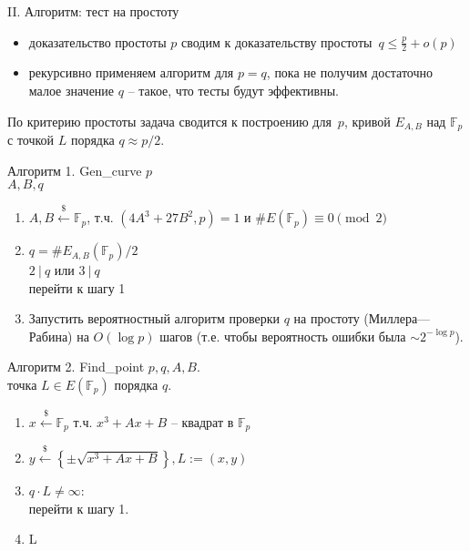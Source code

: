 \documentclass{beamer}
\begin{document}
\begin{frame}{II. Алгоритм: тест на простоту}
    \begin{itemize}
    	\item доказательство простоты $p$ сводим к доказательству простоты~$q \leq \frac{p}{2} + o(p)$
    	\item рекурсивно применяем алгоритм для $p = q$, пока не получим достаточно малое значение $q$ -- такое, что  тесты будут эффективны.
    \end{itemize}
    
    \vspace{0.5em}
    
    По критерию простоты задача сводится к построению для~$p$, кривой $E_{A,B}$ над $\mathbb{F}_p$ с точкой $L$ порядка $q \approx p/2$.
\end{frame}

\begin{frame}{Алгоритм 1. Gen\_curve}
     $p$\\
     $A,B,q$
    \begin{enumerate}
        \item $A, B \xleftarrow{\$} \mathbb{F}_p$, т.ч. $(4A^3 + 27B^2, p) = 1$ и $\#E(\mathbb{F}_p) \equiv 0 \pmod{2}$
        \item $q = \#E_{A,B}(\mathbb{F}_p) / 2$\\
         {$2\ |\ q$ или $3\ |\ q$}\\
        \quad перейти к шагу 1  
        \item Запустить вероятностный алгоритм проверки $q$ на простоту (Миллера—Рабина) на $O(\log p)$ шагов (т.е. чтобы вероятность ошибки была $\sim 2^{-\log p}$).
    \end{enumerate}
\end{frame}

\begin{frame}{Алгоритм 2. Find\_point}
     $p, q, A, B$.\\
     точка $L \in E(\mathbb{F}_p)$ порядка $q$.
    \begin{enumerate}
        \item $x \xleftarrow{\$} \mathbb{F}_p$ т.ч. $x^3+Ax+B$ -- квадрат в $\mathbb{F}_p$
        \item $y \xleftarrow{\$} \left\{ \pm \sqrt{x^3 + Ax+B} \right\}, L:=(x,y)$
        \item {} {$q \cdot L \neq \infty$}:\\
        \quad перейти к шагу 1.
        \item {} L
    \end{enumerate}
\end{frame}
\end{document}
